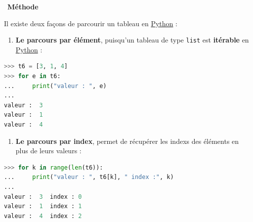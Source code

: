 \documentclass[
  11pt,
]{article}
\newcommand{\passthrough}[1]{#1}
\providecommand{\tightlist}{%
  \setlength{\itemsep}{0pt}\setlength{\parskip}{0pt}}
\newcounter{def}
\newcounter{cours}
\newenvironment{methode}[1]
{\par \medskip    \noindent  
 \begin {bclogo}[arrondi =0.1,logo=\bcoutil, marge=4,noborder = true] {~\textbf{Méthode}   {\itshape #1} }  \par}
{
\end{bclogo}
 \par \bigskip }
\begin{document}
\begin{methode}{}

Il existe deux façons de parcourir un tableau en
\href{https://docs.python.org/3/tutorial/datastructures.html}{Python} :

\begin{enumerate}
\def\labelenumi{\arabic{enumi}.}
\tightlist
\item
  \textbf{Le parcours par élément}, puisqu'un tableau de type
  \passthrough{\lstinline!list!} est \textbf{itérable} en
  \href{https://docs.python.org/3/tutorial/datastructures.html}{Python}
  :
\end{enumerate}

\begin{lstlisting}[language=Python]
>>> t6 = [3, 1, 4]
>>> for e in t6:
...     print("valeur : ", e)
... 
valeur :  3
valeur :  1
valeur :  4
\end{lstlisting}

\begin{enumerate}
\def\labelenumi{\arabic{enumi}.}
\setcounter{enumi}{1}
\tightlist
\item
  \textbf{Le parcours par index}, permet de récupérer les indexs des
  éléments en plus de leurs valeurs :
\end{enumerate}

\begin{lstlisting}[language=Python]
>>> for k in range(len(t6)):
...     print("valeur : ", t6[k], " index :", k)
... 
valeur :  3  index : 0
valeur :  1  index : 1
valeur :  4  index : 2
\end{lstlisting}

\end{methode}
\end{document}

